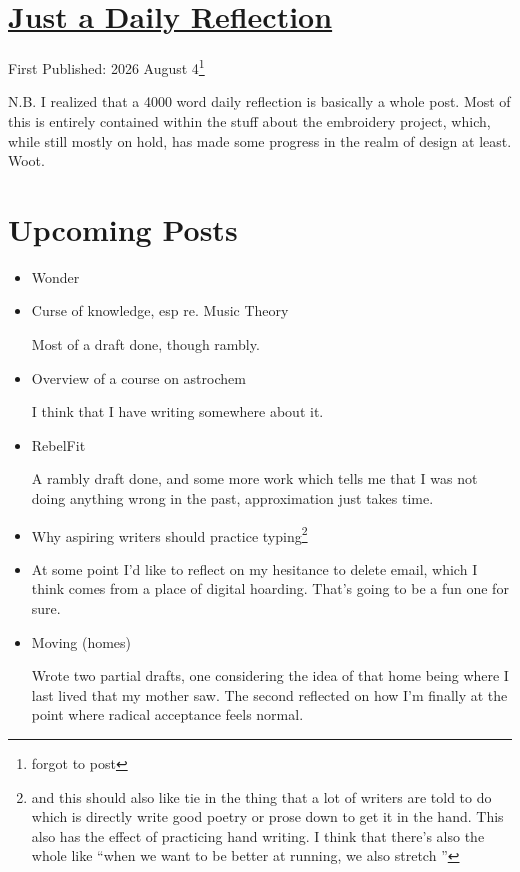 \documentclass[12pt]{article}
\newcommand{\say}[1]{``#1''}
\renewcommand{\,}{\textsuperscript{,}}
\begin{document}
  
\doublespacing  
\section{\href{daily-reflection-2026-08-03.html}{Just a Daily Reflection}}  
First Published: 2026 August 4\footnote{forgot to post}

N.B. I realized that a 4000 word daily reflection is basically a whole post.
Most of this is entirely contained within the stuff about the embroidery project, which, while still mostly on hold, has made some progress in the realm of design at least.
Woot.


\section{Upcoming Posts}  
\begin{itemize}

\item Wonder  
\item Curse of knowledge, esp re. Music Theory

Most of a draft done, though rambly.  
\item Overview of a course on astrochem

I think that I have writing somewhere about it.  
\item RebelFit

A rambly draft done, and some more work which tells me that I was not doing anything wrong in the past, approximation just takes time.  
\item Why aspiring writers should practice typing\footnote{and this should also like tie in the thing that a lot of writers are told to do which is directly write good poetry or prose down to get it in the hand. This also has the effect of practicing hand writing. I think that there's also the whole like \say{when we want to be better at running, we also stretch }}

\item At some point I'd like to reflect on my hesitance to delete email, which I think comes from a place of digital hoarding. That's going to be a fun one for sure.

\item Moving (homes)

Wrote two partial drafts, one considering the idea of that home being where I last lived that my mother saw.
The second reflected on how I'm finally at the point where radical acceptance feels normal.


\end{itemize}
\end{document}
